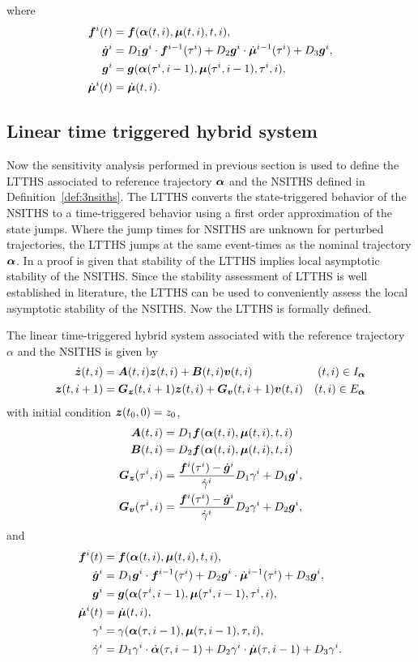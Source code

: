 \documentclass[../DC2017114Bouma.tex]{subfiles}
\begin{document}
where
\begin{align}
{\boldsymbol{f}}^i(t) &= {\boldsymbol{f}}(\boldsymbol{\alpha}(t,i),\boldsymbol{\mu}(t,i),t,i),\\
\dot{{\boldsymbol{g}}}^i &= D_1{\boldsymbol{g}}^i\cdot {\boldsymbol{f}}^{i-1}(\tau^i) + D_2{\boldsymbol{g}}^i\cdot \dot{\boldsymbol{\mu}}^{i-1}(\tau^i) + D_3{\boldsymbol{g}}^i,\\
{\boldsymbol{g}}^i &= {\boldsymbol{g}}(\boldsymbol{\alpha}(\tau^i,i-1),\boldsymbol{\mu}(\tau^i,i-1),\tau^i,i),\\
\dot{\boldsymbol{\mu}}^{i}(t) &= \dot{\boldsymbol{\mu}}(t,i).
\end{align}

\subsection{Linear time triggered hybrid system}
Now the sensitivity analysis performed in previous section is used to define the LTTHS associated to reference trajectory $\boldsymbol{\alpha}$ and the NSITHS defined in Definition~\ref{def:3nsiths}. The LTTHS converts the state-triggered behavior of the NSITHS to a time-triggered behavior using a first order approximation of the state jumps. Where the jump times for NSITHS are unknown for perturbed trajectories, the LTTHS jumps at the same event-times as the nominal trajectory $\boldsymbol{\alpha}$. In \cite{Rijnen2017} a proof is given that stability of the LTTHS implies local asymptotic stability of the NSITHS. Since the stability assessment of LTTHS is well established in literature, the LTTHS can be used to conveniently assess the local asymptotic stability of the NSITHS. Now the LTTHS is formally defined.
\begin{mydef}[LTTHS]\label{def:3ltths}
The linear time-triggered hybrid system associated with the reference trajectory $\alpha$ and the NSITHS is given by
\begin{align}
\dot{{\boldsymbol{z}}}(t,i) &= {\boldsymbol{A}}(t,i){\boldsymbol{z}}(t,i) + {\boldsymbol{B}}(t,i){\boldsymbol{v}}(t,i) &(t,i)\in I_{\boldsymbol{\alpha}}\\
{\boldsymbol{z}}(t,i+1) &= {\boldsymbol{G}}_{{\boldsymbol{z}}}(t,i+1){\boldsymbol{z}}(t,i) +  {\boldsymbol{G}}_{{\boldsymbol{v}}}(t,i+1){\boldsymbol{v}}(t,i) &(t,i)\in E_{\boldsymbol{\alpha}}
\end{align}
with initial condition ${\boldsymbol{z}}(t_0,0)=z_0$,
\begin{align}
{\boldsymbol{A}}(t,i) &= D_1{\boldsymbol{f}}(\boldsymbol{\alpha}(t,i),\boldsymbol{\mu}(t,i),t,i)\\
{\boldsymbol{B}}(t,i) &= D_2{\boldsymbol{f}}(\boldsymbol{\alpha}(t,i),\boldsymbol{\mu}(t,i),t,i)\\
{\boldsymbol{G}}_{{\boldsymbol{z}}}(\tau^i,i) & = \frac{{\boldsymbol{f}}^i(\tau^i) - \dot{{\boldsymbol{g}}}^i}{\dot{\gamma}^i}D_1\gamma^i + D_1{\boldsymbol{g}}^i,\\
{\boldsymbol{G}}_{{\boldsymbol{v}}}(\tau^i,i) & = \frac{{\boldsymbol{f}}^i(\tau^i) - \dot{{\boldsymbol{g}}}^i}{\dot{\gamma}^i}D_2\gamma^i + D_2{\boldsymbol{g}}^i,
\end{align}
and
\begin{align}
{\boldsymbol{f}}^i(t) &= {\boldsymbol{f}}(\boldsymbol{\alpha}(t,i),\boldsymbol{\mu}(t,i),t,i),\\
\dot{{\boldsymbol{g}}}^i &= D_1{\boldsymbol{g}}^i\cdot {\boldsymbol{f}}^{i-1}(\tau^i) + D_2{\boldsymbol{g}}^i\cdot \dot{\boldsymbol{\mu}}^{i-1}(\tau^i) + D_3{\boldsymbol{g}}^i,\\
{\boldsymbol{g}}^i &= {\boldsymbol{g}}(\boldsymbol{\alpha}(\tau^i,i-1),\boldsymbol{\mu}(\tau^i,i-1),\tau^i,i),\\
\dot{\boldsymbol{\mu}}^{i}(t) &= \dot{\boldsymbol{\mu}}(t,i),\\
\gamma^i &= \gamma(\boldsymbol{\alpha}(\tau,i-1),\boldsymbol{\mu}(\tau,i-1),\tau,i),\\
\dot{\gamma}^i &= D_1\gamma^i\cdot\dot{\boldsymbol{\alpha}}(\tau,i-1) + D_2\gamma^i\cdot\dot{\boldsymbol{\mu}}(\tau,i-1) + D_3\gamma^i.
\end{align}
\end{mydef}
\end{document}
